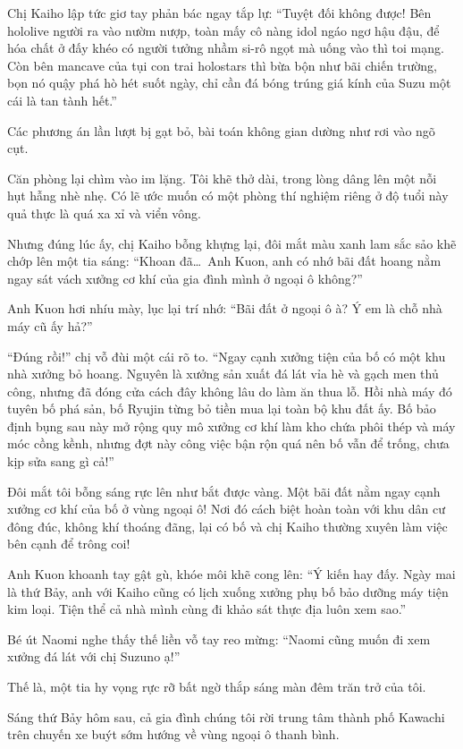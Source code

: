 \documentclass[../main.tex]{subfiles}
\begin{document}
Chị Kaiho lập tức giơ tay phản bác ngay tắp lự: ``Tuyệt đối không được! Bên hololive người ra vào nườm nượp, toàn mấy cô nàng idol ngáo ngơ hậu đậu, để hóa chất ở đấy khéo có người tưởng nhầm si-rô ngọt mà uống vào thì toi mạng. Còn bên mancave của tụi con trai holostars thì bừa bộn như bãi chiến trường, bọn nó quậy phá hò hét suốt ngày, chỉ cần đá bóng trúng giá kính của Suzu một cái là tan tành hết.''

Các phương án lần lượt bị gạt bỏ, bài toán không gian dường như rơi vào ngõ cụt.

Căn phòng lại chìm vào im lặng. Tôi khẽ thở dài, trong lòng dâng lên một nỗi hụt hẫng nhè nhẹ. Có lẽ ước muốn có một phòng thí nghiệm riêng ở độ tuổi này quả thực là quá xa xỉ và viển vông.

Nhưng đúng lúc ấy, chị Kaiho bỗng khựng lại, đôi mắt màu xanh lam sắc sảo khẽ chớp lên một tia sáng: ``Khoan đã\dots\ Anh Kuon, anh có nhớ bãi đất hoang nằm ngay sát vách xưởng cơ khí của gia đình mình ở ngoại ô không?''

Anh Kuon hơi nhíu mày, lục lại trí nhớ: ``Bãi đất ở ngoại ô à? Ý em là chỗ nhà máy cũ ấy hả?''

``Đúng rồi!'' chị vỗ đùi một cái rõ to. ``Ngay cạnh xưởng tiện của bố có một khu nhà xưởng bỏ hoang. Nguyên là xưởng sản xuất đá lát vỉa hè và gạch men thủ công, nhưng đã đóng cửa cách đây không lâu do làm ăn thua lỗ. Hồi nhà máy đó tuyên bố phá sản, bố Ryujin từng bỏ tiền mua lại toàn bộ khu đất ấy. Bố bảo định bụng sau này mở rộng quy mô xưởng cơ khí làm kho chứa phôi thép và máy móc cồng kềnh, nhưng đợt này công việc bận rộn quá nên bố vẫn để trống, chưa kịp sửa sang gì cả!''

Đôi mắt tôi bỗng sáng rực lên như bắt được vàng. Một bãi đất nằm ngay cạnh xưởng cơ khí của bố ở vùng ngoại ô! Nơi đó cách biệt hoàn toàn với khu dân cư đông đúc, không khí thoáng đãng, lại có bố và chị Kaiho thường xuyên làm việc bên cạnh để trông coi!

Anh Kuon khoanh tay gật gù, khóe môi khẽ cong lên: ``Ý kiến hay đấy. Ngày mai là thứ Bảy, anh với Kaiho cũng có lịch xuống xưởng phụ bố bảo dưỡng máy tiện kim loại. Tiện thể cả nhà mình cùng đi khảo sát thực địa luôn xem sao.''

Bé út Naomi nghe thấy thế liền vỗ tay reo mừng: ``Naomi cũng muốn đi xem xưởng đá lát với chị Suzuno ạ!''

Thế là, một tia hy vọng rực rỡ bất ngờ thắp sáng màn đêm trăn trở của tôi.

\ct

Sáng thứ Bảy hôm sau, cả gia đình chúng tôi rời trung tâm thành phố Kawachi trên chuyến xe buýt sớm hướng về vùng ngoại ô thanh bình.
\end{document}
